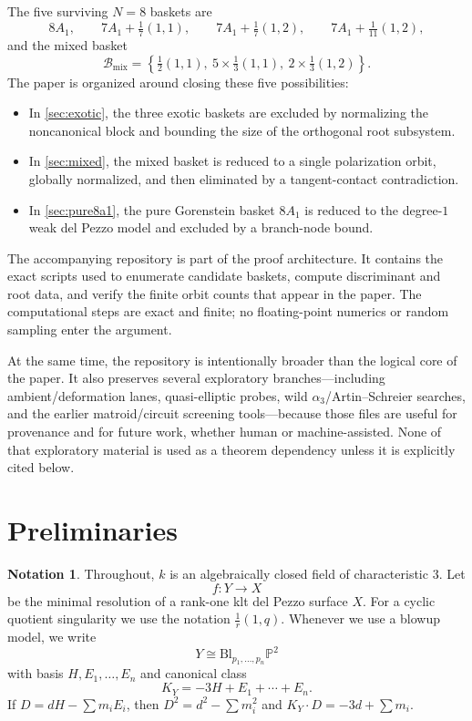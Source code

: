 \documentclass[11pt]{article}
\theoremstyle{definition}
\newtheorem{notation}[notation]{Notation}
\newcommand{\Pbb}{\mathbb P}
\newcommand{\Bl}{\mathrm{Bl}}
\begin{document}
The five surviving $N=8$ baskets are
\[
8A_1,
\qquad
7A_1+\tfrac17(1,1),
\qquad
7A_1+\tfrac17(1,2),
\qquad
7A_1+\tfrac1{11}(1,2),
\]
and the mixed basket
\[
\mathcal B_{\mathrm{mix}}=\left\{\tfrac12(1,1),\ 5\times\tfrac13(1,1),\ 2\times\tfrac13(1,2)\right\}.
\]
The paper is organized around closing these five possibilities:
\begin{itemize}
\item In \cref{sec:exotic}, the three exotic baskets are excluded by normalizing the noncanonical block and bounding the size of the orthogonal root subsystem.
\item In \cref{sec:mixed}, the mixed basket is reduced to a single polarization orbit, globally normalized, and then eliminated by a tangent-contact contradiction.
\item In \cref{sec:pure8a1}, the pure Gorenstein basket $8A_1$ is reduced to the degree-$1$ weak del Pezzo model and excluded by a branch-node bound.
\end{itemize}

The accompanying repository is part of the proof architecture. It contains the exact scripts used to enumerate candidate baskets, compute discriminant and root data, and verify the finite orbit counts that appear in the paper. The computational steps are exact and finite; no floating-point numerics or random sampling enter the argument.

At the same time, the repository is intentionally broader than the logical core of the paper. It also preserves several exploratory branches---including ambient/deformation lanes, quasi-elliptic probes, wild $\alpha_3$/Artin--Schreier searches, and the earlier matroid/circuit screening tools---because those files are useful for provenance and for future work, whether human or machine-assisted. None of that exploratory material is used as a theorem dependency unless it is explicitly cited below.

\section{Preliminaries}\label{sec:prelim}

\begin{notation}
Throughout, $k$ is an algebraically closed field of characteristic $3$. Let
\[
f\colon Y\to X
\]
be the minimal resolution of a rank-one klt del Pezzo surface $X$. For a cyclic quotient singularity we use the notation $\frac1r(1,q)$. Whenever we use a blowup model, we write
\[
Y\cong \Bl_{p_1,\dots,p_n}\Pbb^2
\]
with basis $H,E_1,\dots,E_n$ and canonical class
\[
K_Y=-3H+E_1+\cdots+E_n.
\]
If $D=dH-\sum m_iE_i$, then $D^2=d^2-\sum m_i^2$ and $K_Y\cdot D=-3d+\sum m_i$.
\end{notation}
\end{document}
